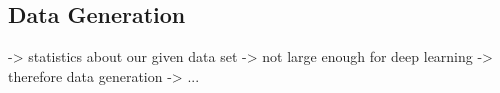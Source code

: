 \subsection{Data Generation}
\label{sec:soft_cut_data_generation}

-> statistics about our given data set
-> not large enough for deep learning
-> therefore data generation
-> ...